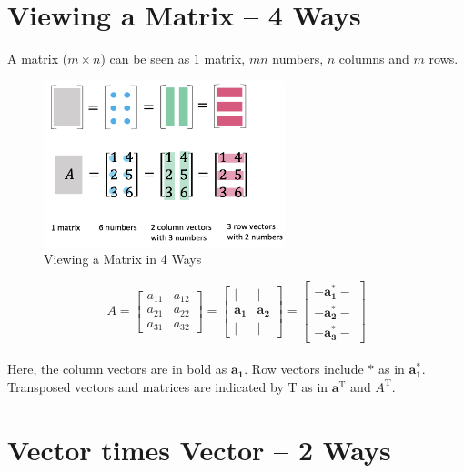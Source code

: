 \documentclass[letterpaper]{article}
\DeclareRobustCommand\transp{^{\mathrm{T}}}
\begin{document}
\tableofcontents

\section{Viewing a Matrix -- 4 Ways}

A matrix ($m \times n$) can be seen as $1$ matrix, $mn$ numbers, $n$ columns and $m$ rows.

\begin{figure}[H]
  \centering
  \includegraphics[keepaspectratio, width=7cm]{ViewingMatrix-4Ways.png}
  \caption{Viewing a Matrix in 4 Ways}
\end{figure}


\begin{equation*}
  A= \begin{bmatrix}
    a_{11} & a_{12}\\
    a_{21} & a_{22}\\
    a_{31} & a_{32}
  \end{bmatrix}
  =
  \begin{bmatrix}
    | & |\\
    \bm{a_1} & \bm{a_2}\\
    | & |
  \end{bmatrix}
  =
  \begin{bmatrix}
    - \bm{a_1^*} -\\
    - \bm{a_2^*} -\\
    - \bm{a_3^*} -
  \end{bmatrix}
\end{equation*} \\

Here, the column vectors are in bold as $\bm{a_1}$.
Row vectors include $\bm{*}$ as in $\bm{a_1^*}$.
Transposed vectors and matrices are indicated by $\mathrm{T}$ as
in $\bm{a}\transp$ and $A\transp$.

\section{Vector times Vector -- 2 Ways}
\end{document}
